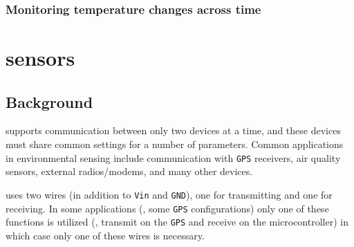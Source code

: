\subsubsection{\color{gray} Monitoring temperature changes across time \color{black}}

\newpage

\section{\uart sensors}
\subsection{Background}
	\uart supports communication between only two devices at a time, and these devices must share common settings for a number of parameters. %
Common applications in environmental sensing include communication with \texttt{GPS} receivers, air quality sensors, external radios/modems, and many other devices. 

\uart uses two wires (in addition to \texttt{Vin} and \texttt{GND}), one for transmitting and one for receiving.
In some applications (\eg, some \texttt{GPS} configurations) only one of these functions is utilized (\eg, transmit on the \texttt{GPS} and receive on the microcontroller) in which case only one of these wires is necessary.

